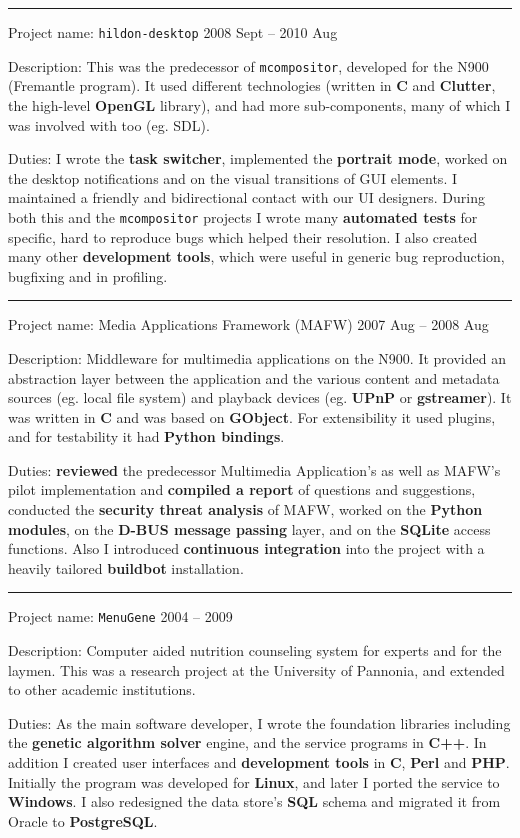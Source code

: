 \documentclass[a4paper,12pt]{article}
\newcommand\Yell{\textbf}
\newcommand\Label{\textsf}
\newcommand{\midline}{\rule[0.5ex]{\linewidth-\parindent}{.5pt}}
\begin{document}
\midline\par
\Label{Project name}: \texttt{hildon-desktop}\hfill
\Label{2008 Sept -- 2010 Aug}\par
\Label{Description}: This was the predecessor of \texttt{mcompositor},
developed for the N900 (Fremantle program).  It used different technologies
(written in \Yell{C} and \Yell{Clutter}, the high-level \Yell{OpenGL}
library), and had more sub-components, many of which I was involved with
too (eg. SDL).\par
\Label{Duties}: I wrote the \Yell{task switcher}, implemented the
\Yell{portrait mode}, worked on the desktop notifications and on
the visual transitions of GUI elements.  I maintained a friendly and
bidirectional contact with our UI designers.  During both this and
the \texttt{mcompositor} projects I wrote many \Yell{automated tests}
for specific, hard to reproduce bugs which helped their resolution.
I also created many other \Yell{development tools}, which were useful
in generic bug reproduction, bugfixing and in profiling.

\midline\par
\Label{Project name}: Media Applications Framework (MAFW)\hfill
\Label{2007 Aug -- 2008 Aug}\par
\Label{Description}: Middleware for multimedia applications on the N900.
It provided an abstraction layer between the application and the various
content and metadata sources (eg. local file system) and playback devices
(eg. \Yell{UPnP} or \Yell{gstreamer}).  It was written in \Yell{C} and was
based on \Yell{GObject}.  For extensibility it used plugins, and for
testability it had \Yell{Python bindings}.\par
\Label{Duties}: \Yell{reviewed} the predecessor Multimedia Application's
as well as MAFW's pilot implementation and \Yell{compiled a report} of
questions and suggestions, conducted the \Yell{security threat analysis}
of MAFW, worked on the \Yell{Python modules}, on the \Yell{D-BUS message
passing} layer, and on the \Yell{SQLite} access functions.  Also I introduced
\Yell{continuous integration} into the project with a heavily tailored
\Yell{buildbot} installation.

\midline\par
\Label{Project name}: \texttt{MenuGene}\hfill
\Label{2004 -- 2009}\par
\Label{Description}: Computer aided nutrition counseling system for
experts and for the laymen.  This was a research project at the University
of Pannonia, and extended to other academic institutions.\par
\Label{Duties}: As the main software developer, I wrote the foundation
libraries including the \Yell{genetic algorithm solver} engine, and the
service programs in \Yell{C++}.  In addition I created user interfaces
and \Yell{development tools} in \Yell{C}, \Yell{Perl} and \Yell{PHP}.
Initially the program was developed for \Yell{Linux}, and later I ported
the service to \Yell{Windows}.  I also redesigned the data store's \Yell{SQL}
schema and migrated it from Oracle to \Yell{PostgreSQL}.
\end{document}
